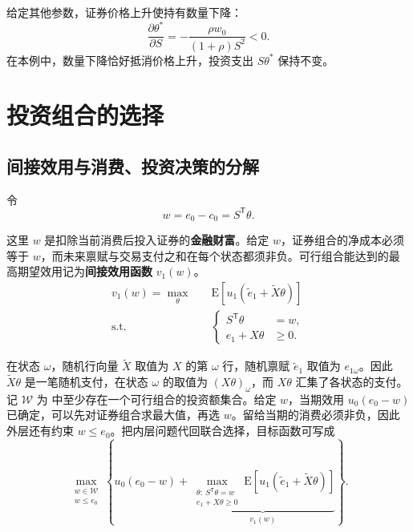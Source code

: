 给定其他参数，证券价格上升使持有数量下降：
\[
 \frac{\partial\theta^*}{\partial S}=-\frac{\rho w_0}{(1+\rho)S^2}<0.
\]
在本例中，数量下降恰好抵消价格上升，投资支出 $S\theta^*$ 保持不变。



\section{投资组合的选择}\label{sec:wj-eight-2}
\subsection{间接效用与消费、投资决策的分解}
\begin{tcolorbox}[knowledge,title=金融财富与间接效用]
令
\begin{equation}
 w=e_0-c_0=S^{\mathsf T}\theta.\label{eq:wj-8-5}
\end{equation}

这里 $w$ 是扣除当前消费后投入证券的\textbf{金融财富}。给定 $w$，证券组合的净成本必须等于 $w$，而未来禀赋与交易支付之和在每个状态都须非负。可行组合能达到的最高期望效用记为\textbf{间接效用函数} $v_1(w)$。
\begin{equation}
 \begin{aligned}
 v_1(w)=\max_{\theta}\quad &\mathrm E[u_1(\tilde e_1+\widetilde X\theta)]\\
 \text{s.t.}\quad &
 \left\{\begin{aligned}
 S^{\mathsf T}\theta&=w,\\
 e_1+X\theta&\ge0.
 \end{aligned}\right.
 \end{aligned}\label{eq:wj-8-6}
\end{equation}
\end{tcolorbox}

在状态 $\omega$，随机行向量 $\widetilde X$ 取值为 $X$ 的第 $\omega$ 行，随机禀赋 $\tilde e_1$ 取值为 $e_{1\omega}$。因此 $\widetilde X\theta$ 是一笔随机支付，在状态 $\omega$ 的取值为 $(X\theta)_\omega$，而 $X\theta$ 汇集了各状态的支付。记 $\mathcal W$ 为 中至少存在一个可行组合的投资额集合。给定 $w$，当期效用 $u_0(e_0-w)$ 已确定，可以先对证券组合求最大值，再选 $w$。留给当期的消费必须非负，因此外层还有约束 $w\le e_0$。把内层问题代回联合选择，目标函数可写成
\[
 \max_{\substack{w\in\mathcal W\\w\le e_0}}
 \left\{u_0(e_0-w)+
 \underbrace{\max_{\substack{\theta:\ S^{\mathsf T}\theta=w\\ e_1+X\theta\ge0}}
 \mathrm E[u_1(\tilde e_1+\widetilde X\theta)]}_{v_1(w)}
 \right\}.
\]

